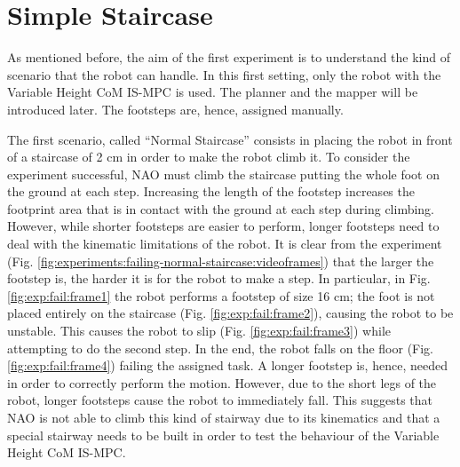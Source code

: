 \section{Simple Staircase}
As mentioned before, the aim of the first experiment is to understand the kind 
of scenario that the robot can handle. In this first setting, only the robot 
with the Variable Height CoM IS-MPC is used. The planner and the mapper will 
be introduced later. The footsteps are, hence, assigned manually.

The first scenario, called ``Normal Staircase'' consists in placing the robot 
in front of a staircase of 2 cm in order to make the robot climb it.
To consider the experiment successful, NAO must climb the staircase 
putting the whole foot on the ground at each step. Increasing the length 
of the footstep increases the footprint area that is in contact with the ground 
at each step during climbing. However, while shorter footsteps are easier to 
perform, longer footsteps need to deal with the kinematic limitations of the 
robot. It is clear from the experiment (Fig.
\ref{fig:experiments:failing-normal-staircase:videoframes}) that the 
larger the footstep is, the harder it is for the robot to make a step. In 
particular, in Fig. \ref{fig:exp:fail:frame1} the robot performs a
footstep of size 16 cm; the foot is not placed entirely on the 
staircase (Fig. \ref{fig:exp:fail:frame2}), causing the robot to be unstable.
This causes the robot to slip (Fig. \ref{fig:exp:fail:frame3})
while attempting to do the second step. In the end, the robot
falls on the floor (Fig. \ref{fig:exp:fail:frame4}) failing the assigned task.
A longer footstep is, hence, needed in 
order to correctly perform the motion. However, due to the short legs of the 
robot, longer footsteps cause the robot to immediately fall. This suggests 
that NAO is not able to climb this kind of stairway due to its kinematics and 
that a special stairway needs to be built in order to test the behaviour of 
the Variable Height CoM IS-MPC.
